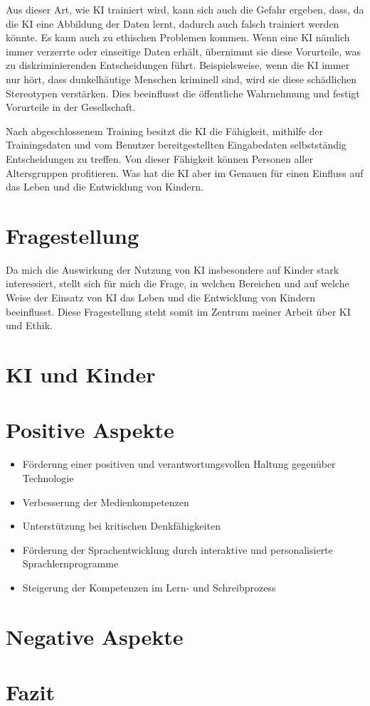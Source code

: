 \documentclass{article}
\begin{document}
Aus dieser Art, wie KI trainiert wird, kann sich auch die Gefahr ergeben, dass, da die KI eine Abbildung der Daten lernt, dadurch auch falsch trainiert werden könnte. Es kann auch zu ethischen Problemen kommen.
Wenn eine KI nämlich immer verzerrte oder einseitige Daten erhält, übernimmt sie diese Vorurteile, was zu diskriminierenden Entscheidungen führt. Beispielsweise, wenn die KI immer nur hört, dass dunkelhäutige Menschen kriminell sind, wird sie diese schädlichen Stereotypen verstärken. Dies beeinflusst die öffentliche Wahrnehmung und festigt Vorurteile in der Gesellschaft.

Nach abgeschlossenem Training besitzt die KI die Fähigkeit, mithilfe der Trainingsdaten und vom Benutzer bereitgestellten Eingabedaten selbstständig Entscheidungen zu treffen. Von dieser Fähigkeit können Personen aller Altersgruppen profitieren. Was hat die KI aber im Genauen für einen Einfluss auf das Leben und die Entwicklung von Kindern.

\section{Fragestellung}

Da mich die Auswirkung der Nutzung von KI insbesondere auf Kinder stark interessiert, stellt sich für mich die Frage, in welchen Bereichen und auf welche Weise der Einsatz von KI das Leben und die Entwicklung von Kindern beeinflusst. Diese Fragestellung steht somit im Zentrum meiner Arbeit über KI und Ethik.

\section{KI und Kinder}


\section{Positive Aspekte}

\begin{itemize}

    \item Förderung einer positiven und verantwortungsvollen Haltung gegenüber Technologie
    \item Verbesserung der Medienkompetenzen
    \item Unterstützung bei kritischen Denkfähigkeiten
    \item Förderung der Sprachentwicklung durch interaktive und personalisierte Sprachlernprogramme
    \item Steigerung der Kompetenzen im Lern- und Schreibprozess

\end{itemize}

\section{Negative Aspekte}


\section{Fazit}




\printbibliography
\end{document}
